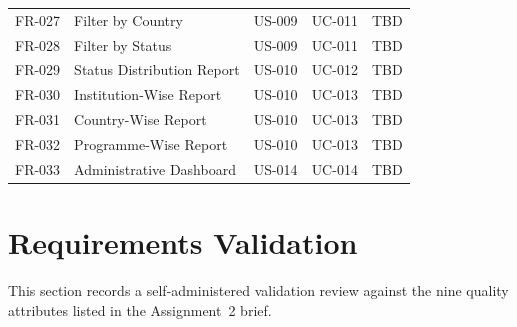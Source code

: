\documentclass[11pt,a4paper]{article}
\begin{document}
\begin{longtable}{@{}p{1.6cm} p{3.4cm} p{2.0cm} p{2.4cm} p{2.4cm}@{}}
FR-027 & Filter by Country & US-009 & UC-011 & TBD \\
FR-028 & Filter by Status & US-009 & UC-011 & TBD \\
FR-029 & Status Distribution Report & US-010 & UC-012 & TBD \\
FR-030 & Institution-Wise Report & US-010 & UC-013 & TBD \\
FR-031 & Country-Wise Report & US-010 & UC-013 & TBD \\
FR-032 & Programme-Wise Report & US-010 & UC-013 & TBD \\
FR-033 & Administrative Dashboard & US-014 & UC-014 & TBD \\
\bottomrule
\end{longtable}

\section{Requirements Validation}
This section records a self-administered validation review against the nine quality attributes listed in the Assignment~2 brief.
\end{document}
